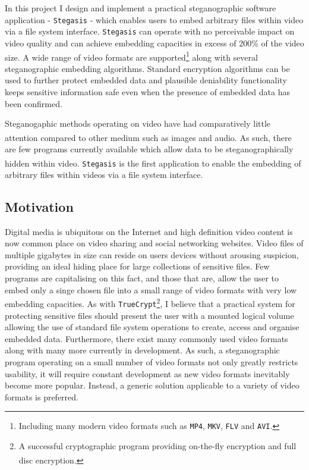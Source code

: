 \documentclass[paper=a4, fontsize=11pt,twoside]{scrartcl}
\numberwithin{table}{section}
\numberwithin{figure}{section}
\numberwithin{algorithm}{section}
\begin{document}
In this project I design and implement a practical steganographic software application - \texttt{Stegasis} - which enables users to embed arbitrary files within video via a file system interface. \texttt{Stegasis} can operate with no perceivable impact on video quality and can achieve embedding capacities in excess of 200\% of the video size. A wide range of video formats are supported\footnote{Including many modern video formats such as \texttt{MP4}, \texttt{MKV}, \texttt{FLV} and \texttt{AVI}.} along with several steganographic embedding algorithms. Standard encryption algorithms can be used to further protect embedded data and plausible deniability functionality keeps sensitive information safe even when the presence of embedded data has been confirmed.

Steganogaphic methods operating on video have had comparatively little attention compared to other medium such as images and audio\textsuperscript{\cite{digmedia2}}. As such, there are few programs currently available which allow data to be steganographically hidden within video\textsuperscript{\cite{survey}}. \texttt{Stegasis} is the first application to enable the embedding of arbitrary files within videos via a file system interface.   



\subsection{Motivation}
Digital media is ubiquitous on the Internet and high definition video content is now common place on video sharing and social networking websites. Video files of multiple gigabytes in size can reside on users devices without arousing suspicion, providing an ideal hiding place for large collections of sensitive files. Few programs are capitalising on this fact, and those that are, allow the user to embed only a singe chosen file into a small range of video formats with very low embedding capacities. As with \texttt{TrueCrypt}\footnote{A successful cryptographic program providing on-the-fly encryption and full disc encryption\textsuperscript{\cite{truecrypt}}.}, I believe that a practical system for protecting sensitive files should present the user with a mounted logical volume allowing the use of standard file system operations to create, access and organise embedded data. Furthermore, there exist many commonly used video formats along with many more currently in development. As such, a steganographic program operating on a small number of video formats not only greatly restricts usability, it will require constant development as new video formats inevitably become more popular. Instead, a generic solution applicable to a variety of video formats is preferred.
\end{document}
